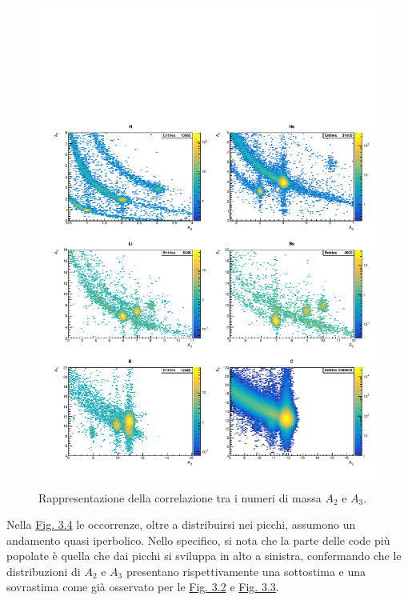 \documentclass[12pt,a4paper,twoside]{report}
\begin{document}
	\begin{figure}[H]
		\centering
		\includegraphics[width=1.03\linewidth,center]{c_MultiCanvasLog3.pdf}
		\caption{Rappresentazione della correlazione tra i numeri di massa $A_2$ e $A_3$.}
		\label{fig:a3}
	\end{figure}
	Nella \hyperref[fig:a3]{Fig. 3.4} le occorrenze, oltre a distribuirsi nei picchi, assumono un andamento quasi iperbolico. Nello specifico, si nota che la parte delle code più popolate è quella che dai picchi si sviluppa in alto a sinistra, confermando che le distribuzioni di $A_2$ e $A_3$ presentano rispettivamente una sottostima e una sovrastima come già osservato per le \hyperref[fig:a1]{Fig. 3.2} e \hyperref[fig:a2]{Fig. 3.3}.
	
\end{document}
